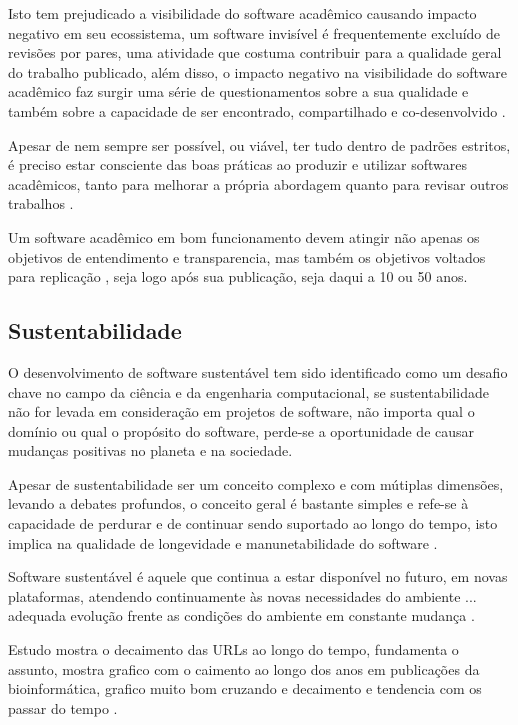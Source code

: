 Isto tem prejudicado a visibilidade do software acadêmico causando impacto
negativo em seu ecossistema, um software invisível é frequentemente excluído de
revisões por pares, uma atividade que costuma contribuir para a qualidade geral
do trabalho publicado, além disso, o
impacto negativo na visibilidade do software acadêmico faz surgir uma
série de questionamentos sobre a sua qualidade e também sobre a
capacidade de ser encontrado, compartilhado e co-desenvolvido
\cite{howison2013, katz2014transitive} \cite{howison2016software}.

Apesar de nem sempre ser possível, ou viável, ter tudo dentro de padrões
estritos, é preciso estar consciente das boas práticas ao produzir e utilizar
softwares acadêmicos, tanto para melhorar a própria abordagem quanto para
revisar outros trabalhos \cite{wilson2014best}.

Um software acadêmico em bom funcionamento devem atingir não apenas os
objetivos de entendimento e transparencia, mas também os objetivos voltados
para replicação \cite{Stodden2010}, seja logo após sua publicação, seja daqui
a 10 ou 50 anos.

\subsection{Sustentabilidade}

O desenvolvimento de software sustentável tem sido identificado como um desafio
chave no campo da ciência e da engenharia computacional, se sustentabilidade
não for levada em consideração em projetos de software, não importa qual o
domínio ou qual o propósito do software, perde-se a oportunidade de causar
mudanças positivas no planeta e na sociedade.

Apesar de sustentabilidade ser um conceito complexo e com mútiplas dimensões,
levando a debates profundos, o conceito geral é bastante simples e refe-se à
capacidade de perdurar e de continuar sendo suportado ao longo do tempo, isto
implica na qualidade de longevidade e manunetabilidade do software
\cite{venters2014software}.

Software sustentável é aquele que continua a estar disponível no futuro, em
novas plataformas, atendendo continuamente às novas necessidades do ambiente
... adequada evolução frente as condições do ambiente em constante mudança
\cite{allen2017engineering}.

Estudo mostra o decaimento das URLs ao longo do tempo, fundamenta o assunto,
mostra grafico com o caimento ao longo dos anos em publicações da
bioinformática, grafico muito bom cruzando e decaimento e tendencia com os
passar do tempo \cite{wren2017use}.


